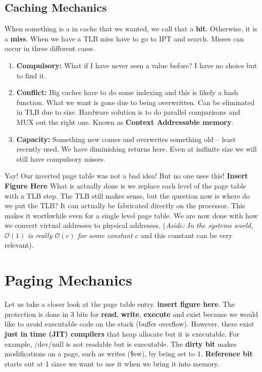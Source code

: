 \documentclass[../base_file/cs1550_notes.tex]{subfiles}
\begin{document}
\subsection{Caching Mechanics}
When something is a in cache that we wanted, we call that a \textbf{hit}.  Otherwise, it is a \textbf{miss}.  When we have a
TLB miss have to go to IPT and search.  Misses can occur in three different cases.
\begin{enumerate}
	\item \textbf{Compulsory:} What if I have never seen a value before?  I have no choice but to find it.
	\item \textbf{Conflict:} Big caches have to do some indexing and this is likely a hash function.  What we want is gone
								due to being overwritten.  Can be eliminated in TLB due to size.  Hardware solution is to
								do parallel comparisons and MUX out the right one.  Known as \textbf{Context Addressable
								memory}.
	\item \textbf{Capacity:} Something new comes and overwrites something old -- least recently used.  We have diminishing
								returns here.  Even at inifinite size we will still have compulsory misses.  
\end{enumerate}
Yay! Our inverted page table was not a bad idea! But no one uses this! \textbf{Insert Figure Here}
What is actually done is we replace each level of the page table with a TLB step.  The TLB still makes sense, but the question
now is where do we put the TLB\@?  It can actually be fabricated directly on the processor.  This makes it worthwhile even for
a single level page table.  We are now done with how we convert virtual addresses to physical addresses. (\textit{Aside:  In the
systems world, $\mathcal{O}(1)$ is really $\mathcal{O}(c)$ for some constant $c$} and this constant can be very relevant).
\section{Paging Mechanics}
Let us take a closer look at the page table entry.  \textbf{insert figure here}.  The protection is done in 3 bits for \textbf{read},
\textbf{write}, \textbf{execute} and exist because we would like to avoid executable code on the stack (buffer overflow).  However,
there exist \textbf{just in time (JIT) compilers} that heap allocate but it is executable.  For example, /dev/null is not readable but
is executable.  The \textbf{dirty bit} makes modifications on a page, such as writes (\$sw), by being set to 1.  \textbf{Reference bit}
starts out at 1 since we want to use it when we bring it into memory.
\end{document}
